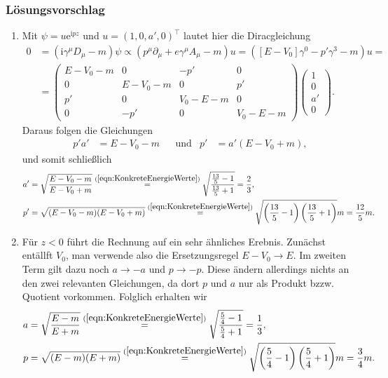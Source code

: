 \documentclass[german, parskip=full]{scrartcl}
\newcommand{\kla}{}
\newcommand{\tecxt}{}
\newcommand{\I}{\text{i}}
\newcommand{\e}{\text{e}}
\begin{document}
\subsubsection*{Lösungsvorschlag}
\begin{enumerate}
\item[a)] Mit $\psi = u\e^{\I pz}$ und $u=(1,0,a',0)^\top$ lautet hier die Diracgleichung
\begin{align*}
0&=(\I\gamma^\mu D_\mu -m)\psi\propto(p^\mu\partial_\mu + e\gamma^\mu A_\mu  -m)u=([E-V_0]\gamma^0-p'\gamma^3-m)u=\\
&=\begin{pmatrix}
E-V_0-m&0&-p'&0\\
0&E-V_0-m&0&p'\\
p'&0&V_0-E-m&0\\
0&-p'&0&V_0-E-m
\end{pmatrix}\begin{pmatrix}
1 \\ 0 \\ a' \\ 0
\end{pmatrix} .
\end{align*}
Daraus folgen die Gleichungen
\begin{align*}
p'a'&=E-V_0-m&&\tecxt\text{und}&p'&=a'(E-V_0+m),
\end{align*}
und somit schließlich
\begin{align*}
a'&=\sqrt{\frac{E-V_0-m}{E-V_0+m}}\overset{(\ref{eqn:KonkreteEnergieWerte})}{=}\sqrt{\frac{\frac{13}{5}-1}{\frac{13}{5}+1}}=\frac{2}{3},\\
p'&=\sqrt{(E-V_0-m)(E-V_0+m)}\overset{(\ref{eqn:KonkreteEnergieWerte})}{=}\sqrt{\kla\left( {\frac{13}{5}-1} \right)\kla\left( {\frac{13}{5}+1} \right)}m=\frac{12}{5}m.
\end{align*}
\item[b)] Für $z<0$ führt die Rechnung auf ein sehr ähnliches Erebnis.
Zunächst entällft $V_0$, man verwende also die Ersetzungsregel $E-V_0\rightarrow E$.
Im zweiten Term gilt dazu noch $a\rightarrow -a$ und $p\rightarrow -p$.
Diese ändern allerdings nichts an den zwei relevanten Gleichungen, da dort $p$ und $a$ nur als Produkt bzzw. Quotient vorkommen.
Folglich erhalten wir
\begin{align*}
a&=\sqrt{\frac{E-m}{E+m}}\overset{(\ref{eqn:KonkreteEnergieWerte})}{=}\sqrt{\frac{\frac{5}{4}-1}{\frac{5}{4}+1}}=\frac{1}{3},\\
p&=\sqrt{(E-m)(E+m)}\overset{(\ref{eqn:KonkreteEnergieWerte})}{=}\sqrt{\kla\left( {\frac{5}{4}-1} \right)\kla\left( {\frac{5}{4}+1} \right)}m=\frac{3}{4}m.

\end{align*}
\end{enumerate}
\end{document}
